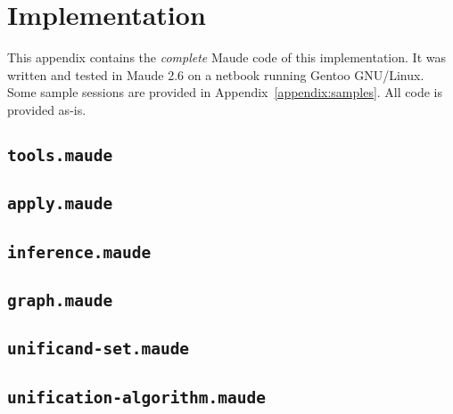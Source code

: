 \documentclass[11pt]{article}
\begin{document}
\section{Implementation}\label{appendix:implementation}

This appendix contains the \emph{complete} Maude code of this implementation.
It was written and tested in Maude 2.6 on a netbook running Gentoo GNU/Linux.
Some sample sessions are provided in Appendix~\ref{appendix:samples}. All code
is provided as-is.

\subsection{\lstinline|tools.maude|}
\label{subappendix:tools-mod}

\vspace{2em}

\subsection{\lstinline|apply.maude|}
\label{subappendix:apply-mod}

\vspace{2em}

\subsection{\lstinline|inference.maude|}
\label{subappendix:inference-mod}

\vspace{2em}

\subsection{\lstinline|graph.maude|}
\label{subappendix:graph-mod}

\vspace{2em}

\subsection{\lstinline|unificand-set.maude|}
\label{subappendix:unificand-set-mod}

\vspace{2em}

\subsection{\lstinline|unification-algorithm.maude|}
\label{subappendix:unif-alg-theory}

\vspace{2em}
\end{document}
